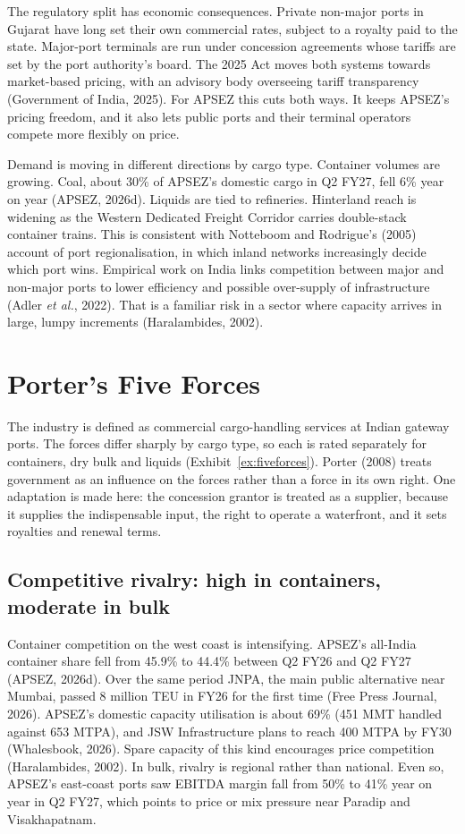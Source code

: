 \documentclass[12pt, a4paper]{article}
\begin{document}
The regulatory split has economic consequences. Private non-major ports in
Gujarat have long set their own commercial rates, subject to a royalty paid to
the state. Major-port terminals are run under concession agreements whose
tariffs are set by the port authority's board. The 2025 Act moves both systems
towards market-based pricing, with an advisory body overseeing tariff
transparency (Government of India, 2025). For APSEZ this cuts both ways. It
keeps APSEZ's pricing freedom, and it also lets public ports and their terminal
operators compete more flexibly on price.

Demand is moving in different directions by cargo type. Container volumes are
growing. Coal, about 30\% of APSEZ's domestic cargo in Q2 FY27, fell 6\% year on
year (APSEZ, 2026d). Liquids are tied to refineries. Hinterland reach is
widening as the Western Dedicated Freight Corridor carries double-stack
container trains. This is consistent with Notteboom and Rodrigue's (2005)
account of port regionalisation, in which inland networks increasingly decide
which port wins. Empirical work on India links competition between major and
non-major ports to lower efficiency and possible over-supply of infrastructure
(Adler \textit{et al.}, 2022). That is a familiar risk in a sector where
capacity arrives in large, lumpy increments (Haralambides, 2002).

\section{Porter's Five Forces}\label{sec:fiveforces}
The industry is defined as commercial cargo-handling services at Indian gateway
ports. The forces differ sharply by cargo type, so each is rated separately for
containers, dry bulk and liquids (Exhibit~\ref{ex:fiveforces}). Porter (2008)
treats government as an influence on the forces rather than a force in its own
right. One adaptation is made here: the concession grantor is treated as a
supplier, because it supplies the indispensable input, the right to operate a
waterfront, and it sets royalties and renewal terms.

\subsection{Competitive rivalry: high in containers, moderate in bulk}
Container competition on the west coast is intensifying. APSEZ's all-India
container share fell from 45.9\% to 44.4\% between Q2 FY26 and Q2 FY27 (APSEZ,
2026d). Over the same period JNPA, the main public alternative near Mumbai,
passed 8 million TEU in FY26 for the first time (Free Press Journal, 2026).
APSEZ's domestic capacity utilisation is about 69\% (451 MMT handled against 653
MTPA), and JSW Infrastructure plans to reach 400 MTPA by FY30 (Whalesbook,
2026). Spare capacity of this kind encourages price competition (Haralambides,
2002). In bulk, rivalry is regional rather than national. Even so, APSEZ's
east-coast ports saw EBITDA margin fall from 50\% to 41\% year on year in Q2
FY27, which points to price or mix pressure near Paradip and Visakhapatnam.
\end{document}
